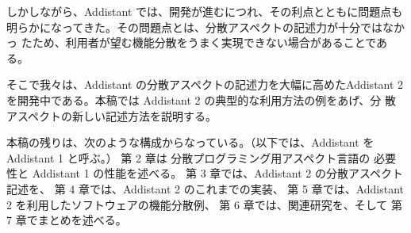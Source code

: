 しかしながら、Addistant では、開発が進むにつれ、その利点とともに問題点も
明らかになってきた。その問題点とは、分散アスペクトの記述力が十分ではなかっ
たため、利用者が望む機能分散をうまく実現できない場合があることである。

そこで我々は、Addistant の分散アスペクトの記述力を大幅に高めたAddistant
2を開発中である。本稿では Addistant 2 の典型的な利用方法の例をあげ、分
散アスペクトの新しい記述方法を説明する。

本稿の残りは、次のような構成からなっている。（以下では、Addistant を
Addistant 1 と呼ぶ。）
第 2 章は 分散プログラミング用アスペクト言語の
必要性と Addistant 1 の性能を述べる。
第 3 章では、Addistant 2 の分散アスペクト記述を、
第 4 章では、Addistant 2 のこれまでの実装、
第 5 章では、Addistant 2 を利用したソフトウェアの機能分散例、
第 6 章では、関連研究を、そして
第 7 章でまとめを述べる。
